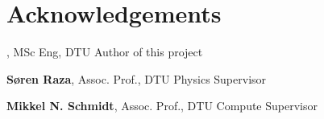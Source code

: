 \section*{Acknowledgements}
\textbf{\thesisauthor}, MSc Eng, DTU \newline
Author of this project

\textbf{Søren Raza}, Assoc. Prof., DTU Physics \newline
Supervisor

\textbf{Mikkel N. Schmidt}, Assoc. Prof., DTU Compute \newline
Supervisor

